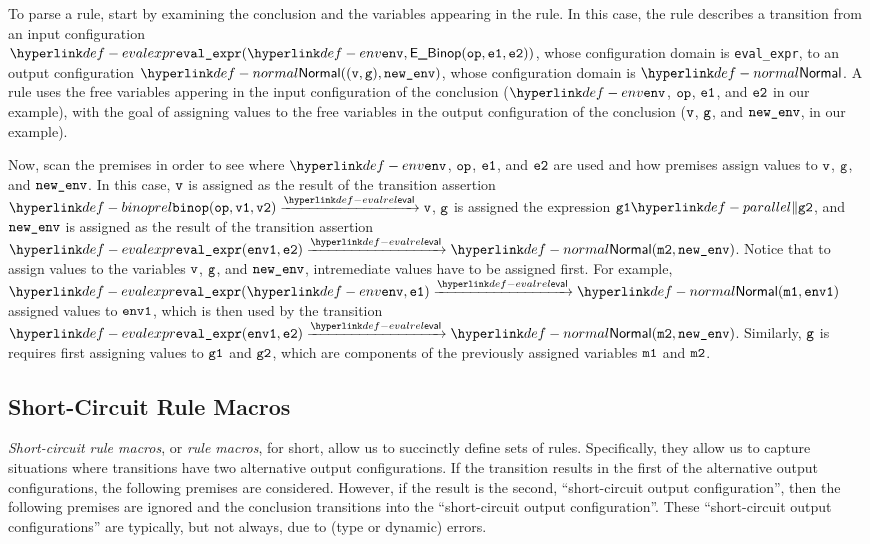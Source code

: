 To parse a rule, start by examining the conclusion and the variables appearing in the rule.
In this case, the rule describes a transition from an input configuration \\
$\evalexpr{ \env, \EBinop(\op, \veone, \vetwo) }$,
whose configuration domain is \texttt{eval\_expr}, to an output configuration $\Normal((\vv, \vg), \newenv)$,
whose configuration domain is $\Normal$.
%
A rule uses the free variables appering in the input configuration of the conclusion
($\env$, $\texttt{op}$, $\texttt{e1}$, and $\texttt{e2}$ in our example),
with the goal of assigning values to the free variables in the output configuration
of the conclusion ($\texttt{v}$, $\texttt{g}$, and $\texttt{new\_env}$, in our example).

Now, scan the premises in order to see where $\env$, $\texttt{op}$, $\texttt{e1}$, and $\texttt{e2}$ are used and how
premises assign values to $\texttt{v}$, $\texttt{g}$, and $\texttt{new\_env}$.
%
In this case, $\texttt{v}$ is assigned as the result of the transition assertion
$\binoprel(\op, \vvone, \vvtwo) \evalarrow \vv$,
$\texttt{g}$ is assigned the expression $\vgone \parallelcomp \vgtwo$,
and $\texttt{new\_env}$ is assigned as the result of the transition assertion
$\evalexpr{ \envone, \vetwo } \evalarrow \Normal(\vmtwo, \newenv)$.
%
Notice that to assign values to the variables $\texttt{v}$, $\texttt{g}$, and $\texttt{new\_env}$,
intremediate values have to be assigned first.
For example, $\evalexpr{ \env, \veone} \evalarrow \Normal(\vmone, \envone)$
assigned values to $\texttt{env1}$, which is then used by the transition \\
$\evalexpr{ \envone, \vetwo } \evalarrow \Normal(\vmtwo, \newenv)$.
Similarly, $\texttt{g}$ is requires first assigning values to $\texttt{g1}$ and $\texttt{g2}$,
which are components of the previously assigned variables $\texttt{m1}$ and $\texttt{m2}$.

\subsection{Short-Circuit Rule Macros}

\emph{Short-circuit rule macros}, or \emph{rule macros}, for short, allow us to succinctly define sets of rules.
Specifically, they allow us to capture situations where
transitions have two alternative output configurations.
If the transition results in the first of the alternative output configurations, the following premises are considered.
However, if the result is the second, ``short-circuit output configuration'', then the following premises are ignored
and the conclusion transitions into the ``short-circuit output configuration''.
These ``short-circuit output configurations'' are typically, but not always, due to (type or dynamic) errors.

